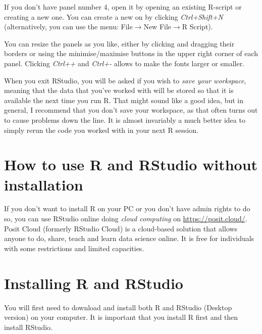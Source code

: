 \documentclass[
  12pt,
  oneside]{book}
\begin{document}
If you don't have panel number 4, open it by opening an existing R-script or creating a new one. You can create a new on by clicking \emph{Ctrl+Shift+N} (alternatively, you can use the menu: File\(\rightarrow\)New File\(\rightarrow\)R Script).

You can resize the panels as you like, either by clicking and dragging their borders or using the minimise/maximise buttons in the upper right corner of each panel. Clicking \emph{Ctrl++} and \emph{Ctrl+-} allows to make the fonts larger or smaller.

When you exit RStudio, you will be asked if you wish to \emph{save your workspace}, meaning that the data that you've worked with will be stored so that it is available the next time you run R. That might sound like a good idea, but in general, I recommend that you don't save your workspace, as that often turns out to cause problems down the line. It is almost invariably a much better idea to simply rerun the code you worked with in your next R session.

\hypertarget{how-to-use-r-and-rstudio-without-installation}{%
\section{How to use R and RStudio without installation}\label{how-to-use-r-and-rstudio-without-installation}}

If you don't want to install R on your PC or you don't have admin rights to do so, you can use RStudio online doing \emph{cloud computing} on \url{https://posit.cloud/}.
Posit Cloud (formerly RStudio Cloud) is a cloud-based solution that allows anyone to do, share, teach and learn data science online. It is free for individuals with some restrictions and limited capacities.

\hypertarget{installing}{%
\section{Installing R and RStudio}\label{installing}}

You will first need to download and install both R and RStudio (Desktop version) on your computer. It is important that you install R first and then install RStudio.
\end{document}
